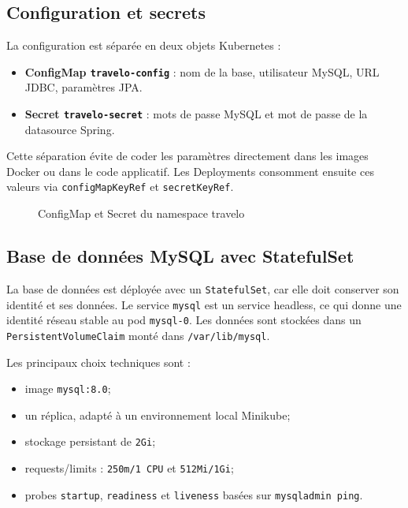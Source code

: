 \documentclass[11pt,a4paper]{article}
\begin{document}
\subsection{Configuration et secrets}

La configuration est séparée en deux objets Kubernetes :
\begin{itemize}
    \item \textbf{ConfigMap \texttt{travelo-config}} : nom de la base, utilisateur MySQL, URL JDBC, paramètres JPA.
    \item \textbf{Secret \texttt{travelo-secret}} : mots de passe MySQL et mot de passe de la datasource Spring.
\end{itemize}

Cette séparation évite de coder les paramètres directement dans les images Docker ou dans le code applicatif. Les Deployments consomment ensuite ces valeurs via \texttt{configMapKeyRef} et \texttt{secretKeyRef}.

\begin{figure}[H]
    \centering
    
    \caption{ConfigMap et Secret du namespace travelo}
\end{figure}

\subsection{Base de données MySQL avec StatefulSet}

La base de données est déployée avec un \texttt{StatefulSet}, car elle doit conserver son identité et ses données. Le service \texttt{mysql} est un service headless, ce qui donne une identité réseau stable au pod \texttt{mysql-0}. Les données sont stockées dans un \texttt{PersistentVolumeClaim} monté dans \texttt{/var/lib/mysql}.

Les principaux choix techniques sont :
\begin{itemize}
    \item image \texttt{mysql:8.0};
    \item un réplica, adapté à un environnement local Minikube;
    \item stockage persistant de \texttt{2Gi};
    \item requests/limits : \texttt{250m/1 CPU} et \texttt{512Mi/1Gi};
    \item probes \texttt{startup}, \texttt{readiness} et \texttt{liveness} basées sur \texttt{mysqladmin ping}.
\end{itemize}
\end{document}
